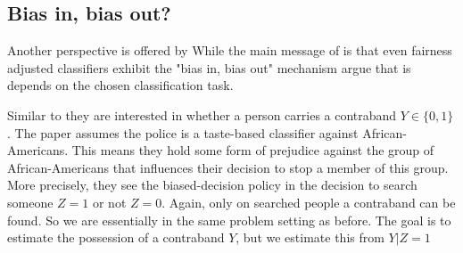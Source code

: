 \subsection{Bias in, bias out?}

Another perspective is offered by \cite{rambachan2016}
While the main message of \cite{kallus2018} is that even fairness adjusted classifiers exhibit the "bias in, bias out" mechanism \cite{rambachan2016} argue that is depends on the chosen classification task.

Similar to \cite{kallus2018} they are interested in whether a person carries a contraband $Y \in \{0, 1\}$. The paper assumes the police is a taste-based classifier against African-Americans. This means they hold some form of prejudice against the group of African-Americans that influences their decision to stop a member of this group. More precisely, they see the biased-decision policy in the decision to search someone $Z = 1$ or not $Z = 0$. Again, only on searched people a contraband can be found. So we are essentially in the same problem setting as before. The goal is to estimate the possession of a contraband $Y$, but we estimate this from $Y | Z = 1$

